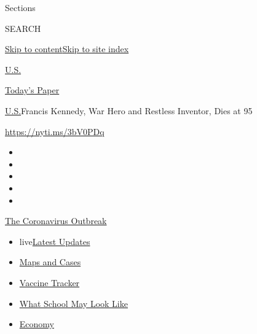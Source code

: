 Sections

SEARCH

\protect\hyperlink{site-content}{Skip to
content}\protect\hyperlink{site-index}{Skip to site index}

\href{https://www.nytimes.com/section/us}{U.S.}

\href{https://myaccount.nytimes.com/auth/login?response_type=cookie\&client_id=vi}{}

\href{https://www.nytimes.com/section/todayspaper}{Today's Paper}

\href{/section/us}{U.S.}\textbar{}Francis Kennedy, War Hero and Restless
Inventor, Dies at 95

\url{https://nyti.ms/3bV0PDq}

\begin{itemize}
\item
\item
\item
\item
\item
\end{itemize}

\href{https://www.nytimes.com/news-event/coronavirus?action=click\&pgtype=Article\&state=default\&region=TOP_BANNER\&context=storylines_menu}{The
Coronavirus Outbreak}

\begin{itemize}
\tightlist
\item
  live\href{https://www.nytimes.com/2020/08/01/world/coronavirus-covid-19.html?action=click\&pgtype=Article\&state=default\&region=TOP_BANNER\&context=storylines_menu}{Latest
  Updates}
\item
  \href{https://www.nytimes.com/interactive/2020/us/coronavirus-us-cases.html?action=click\&pgtype=Article\&state=default\&region=TOP_BANNER\&context=storylines_menu}{Maps
  and Cases}
\item
  \href{https://www.nytimes.com/interactive/2020/science/coronavirus-vaccine-tracker.html?action=click\&pgtype=Article\&state=default\&region=TOP_BANNER\&context=storylines_menu}{Vaccine
  Tracker}
\item
  \href{https://www.nytimes.com/interactive/2020/07/29/us/schools-reopening-coronavirus.html?action=click\&pgtype=Article\&state=default\&region=TOP_BANNER\&context=storylines_menu}{What
  School May Look Like}
\item
  \href{https://www.nytimes.com/live/2020/07/31/business/stock-market-today-coronavirus?action=click\&pgtype=Article\&state=default\&region=TOP_BANNER\&context=storylines_menu}{Economy}
\end{itemize}

